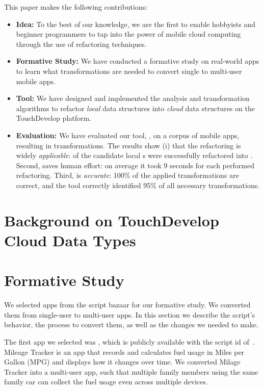 \documentclass{sigplanconf}
\begin{document}
This paper makes the following contributions:
\begin{itemize}
\item{\textbf{Idea:}} To the best of our knowledge, we are the first to enable hobbyists and beginner programmers to tap into the power of mobile cloud
computing through the use of refactoring techniques.

\item{\textbf{Formative Study:}} We have conducted a formative study on \numFormative real-world apps to learn what transformations are needed to convert single to multi-user mobile apps. 

\item{\textbf{Tool:}} We have designed and implemented the analysis and transformation algorithms to refactor \emph{local} data structures into \emph{cloud} data structures on the TouchDevelop platform. 

\item{\textbf{Evaluation:}} We have evaluated our tool, \tool, on a corpus of \numScripts mobile apps, resulting in \numTransformations transformations. The results show (i) that the refactoring is widely \emph{applicable}: \percentRefactored of the candidate local s were successfully refactored into . Second, \tool saves human effort: on average it took 9 seconds for each performed refactoring. Third, \tool is  
\emph{accurate}: 100\% of the applied transformations are correct, and the tool correctly identified 95\% of all necessary transformations.  
\end{itemize}

\section{Background on TouchDevelop Cloud Data Types}


\section{Formative Study}
\label{sec:Formative}

We selected \numFormative apps from the \TD script bazaar for our formative study. We converted them from single-user to multi-user apps. In this section we describe the script's behavior, the process to convert them, as well as the changes we needed to make.

The first app we selected was \MT, which is publicly available with the script id of~\cite{MileageTracker}.  Mileage Tracker is an app that records and calculates fuel usage in Miles per Gallon (MPG) and displays how it changes over time. We converted Milage Tracker into a multi-user app, such that multiple family members using the same family car can collect the fuel usage even across multiple devices.
\end{document}
